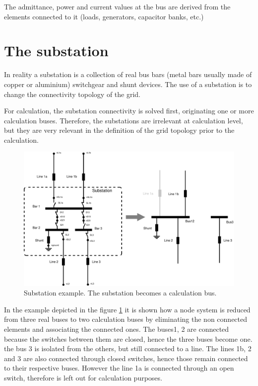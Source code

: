 \documentclass[a4paper,twoside,fleqn]{tufte-book}
\begin{document}
The admittance, power and current values at the bus are derived from the elements connected to it (loads, generators, capacitor banks, etc.)


\section{The substation}

In reality a substation is a collection of real bus bars (metal bars usually made of copper or aluminium) switchgear and shunt devices. The use of a substation is to change the connectivity topology of the grid.

For calculation, the substation connectivity is solved first, originating one or more calculation buses. Therefore, the substations are irrelevant at calculation level, but they are very relevant in the definition of the grid topology prior to the calculation.

\begin{figure}
	\includegraphics[width=0.99\linewidth]{img/Substation.eps}
	\caption{Substation example. The substation becomes a calculation bus.}
	\label{substation_model}
\end{figure}

In the example depicted in the figure \ref{substation_model} it is shown how a node system is reduced from three real buses to two calculation buses by eliminating the non connected elements and associating the connected ones. The buses1, 2 are connected because the switches between them are closed, hence the three buses become one. the bus 3 is isolated from the others, but still connected to a line. The lines 1b, 2 and 3 are also connected through closed switches, hence those remain connected to their respective buses. However the line 1a is connected through an open switch, therefore is left out for calculation purposes.
\end{document}
